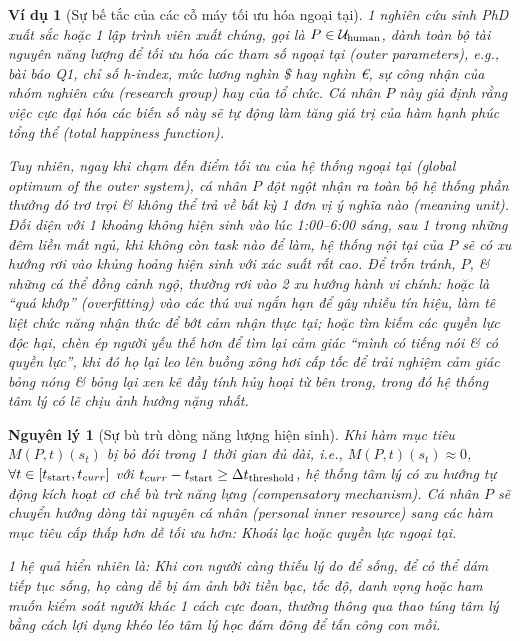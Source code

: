 \documentclass{report}
\newtheorem{nguyenly}{Nguyên lý}
\newtheorem{vidu}{Ví dụ}
\begin{document}
\begin{vidu}[Sự bế tắc của các cỗ máy tối ưu hóa ngoại tại]
	1 nghiên cứu sinh PhD xuất sắc hoặc 1 lập trình viên xuất chúng, gọi là $P\in{\cal U}_{\rm human}$, dành toàn bộ tài nguyên năng lượng để tối ưu hóa các tham số ngoại tại (outer parameters), e.g., bài báo Q1, chỉ số h-index, mức lương nghìn \$ hay nghìn \euro, sự công nhận của nhóm nghiên cứu (research group) hay của tổ chức. Cá nhân $P$ này giả định rằng việc cực đại hóa các biến số này sẽ tự động làm tăng giá trị của hàm hạnh phúc tổng thể (total happiness function).
	
	Tuy nhiên, ngay khi chạm đến điểm tối ưu của hệ thống ngoại tại (global optimum of the outer system), cá nhân $P$ đột ngột nhận ra toàn bộ hệ thống phần thưởng đó trơ trọi \& không thể trả về bất kỳ 1 đơn vị ý nghĩa nào (meaning unit). Đối diện với 1 khoảng không hiện sinh vào lúc 1:00--6:00 sáng, sau 1 trong những đêm liền mất ngủ, khi không còn task nào để làm, hệ thống nội tại của $P$ sẽ có xu hướng rơi vào khủng hoảng hiện sinh với xác suất rất cao. Để trốn tránh, $P$, \& những cá thể đồng cảnh ngộ, thường rơi vào 2 xu hướng hành vi chính: hoặc là ``quá khớp'' (overfitting) vào các thú vui ngắn hạn để gây nhiễu tín hiệu, làm tê liệt chức năng nhận thức để bớt cảm nhận thực tại; hoặc tìm kiếm các quyền lực độc hại, chèn ép người yếu thế hơn để tìm lại cảm giác ``mình có tiếng nói \& có quyền lực'', khi đó họ lại leo lên buồng xông hơi cấp tốc để trải nghiệm cảm giác bỏng nóng \& bỏng lại xen kẽ đầy tính hủy hoại từ bên trong, trong đó hệ thống tâm lý có lẽ chịu ảnh hưởng nặng nhất.
\end{vidu}

\begin{nguyenly}[Sự bù trù dòng năng lượng hiện sinh]
	Khi hàm mục tiêu $M(P,t)(s_t)$ bị bỏ đói trong 1 thời gian đủ dài, i.e., $M(P,t)(s_t)\approx0$, $\forall t\in[t_{\rm start},t_{curr}]$ với $t_{curr} - t_{\rm start}\ge\Delta t_{\rm threshold}$, hệ thống tâm lý có xu hướng tự động kích hoạt cơ chế bù trừ năng lựng (compensatory mechanism). Cá nhân $P$ sẽ chuyển hướng dòng tài nguyên cá nhân (personal inner resource) sang các hàm mục tiêu cấp thấp hơn dễ tối ưu hơn: Khoái lạc hoặc quyền lực ngoại tại.
	
	1 hệ quả hiển nhiên là: Khi con người càng thiếu lý do để sống, để có thể dám tiếp tục sống, họ càng dễ bị ám ảnh bởi tiền bạc, tốc độ, danh vọng hoặc ham muốn kiểm soát người khác 1 cách cực đoan, thường thông qua thao túng tâm lý bằng cách lợi dụng khéo léo tâm lý học đám đông để tấn công con mồi.
\end{nguyenly}
\end{document}
